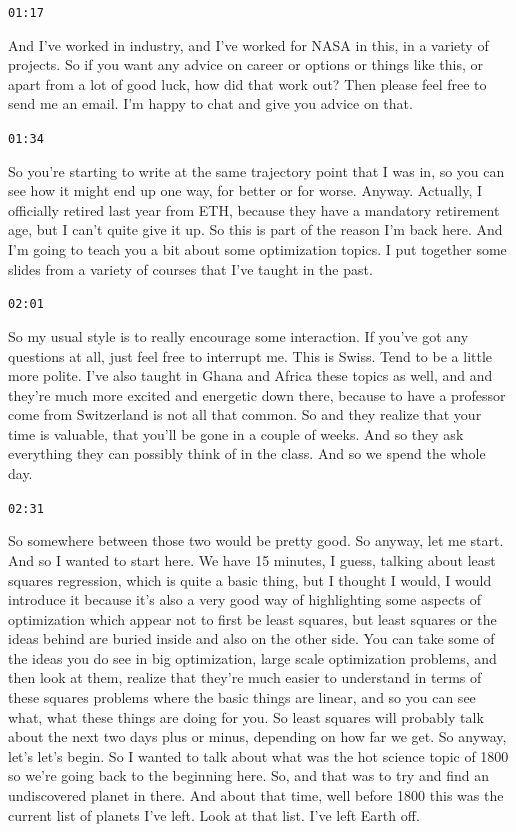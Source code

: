 \documentclass[11pt,a4paper]{article}
\newcommand{\timestamp}[1]{%
  \par\vspace{0.35em}%
  \noindent\colorbox{timestampback}{\textcolor{timestampblue}{\small\texttt{#1}}}%
  \par\vspace{0.2em}%
}
\begin{document}
\timestamp{01:17}

And I've worked in industry, and I've worked for NASA in this, in a variety of projects. So if you want any advice on career or options or things like this, or apart from a lot of good luck, how did that work out? Then please feel free to send me an email. I'm happy to chat and give you advice on that.



\timestamp{01:34}

So you're starting to write at the same trajectory point that I was in, so you can see how it might end up one way, for better or for worse. Anyway. Actually, I officially retired last year from ETH, because they have a mandatory retirement age, but I can't quite give it up. So this is part of the reason I'm back here. And I'm going to teach you a bit about some optimization topics. I put together some slides from a variety of courses that I've taught in the past.



\timestamp{02:01}

So my usual style is to really encourage some interaction. If you've got any questions at all, just feel free to interrupt me. This is Swiss. Tend to be a little more polite. I've also taught in Ghana and Africa these topics as well, and and they're much more excited and energetic down there, because to have a professor come from Switzerland is not all that common. So and they realize that your time is valuable, that you'll be gone in a couple of weeks. And so they ask everything they can possibly think of in the class. And so we spend the whole day.



\timestamp{02:31}

So somewhere between those two would be pretty good. So anyway, let me start. And so I wanted to start here. We have 15 minutes, I guess, talking about least squares regression, which is quite a basic thing, but I thought I would, I would introduce it because it's also a very good way of highlighting some aspects of optimization which appear not to first be least squares, but least squares or the ideas behind are buried inside and also on the other side. You can take some of the ideas you do see in big optimization, large scale optimization problems, and then look at them, realize that they're much easier to understand in terms of these squares problems where the basic things are linear, and so you can see what, what these things are doing for you. So least squares will probably talk about the next two days plus or minus, depending on how far we get. So anyway, let's let's begin. So I wanted to talk about what was the hot science topic of 1800 so we're going back to the beginning here. So, and that was to try and find an undiscovered planet in there. And about that time, well before 1800 this was the current list of planets I've left. Look at that list. I've left Earth off.
\end{document}
